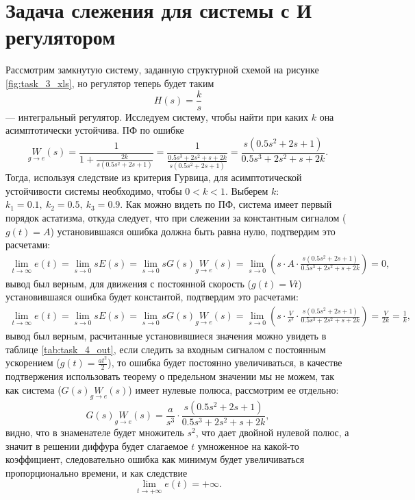 \section{Задача слежения для системы с И регулятором}

Рассмотрим замкнутую систему, заданную структурной схемой на рисунке \ref{fig:task_3_xls},
но регулятор теперь будет таким
\begin{equation*}
    H(s)=\frac{k}{s}
\end{equation*}
--- интегральный регулятор. Исследуем систему, чтобы найти при каких $k$ она асимптотически
устойчива. ПФ по ошибке
\begin{equation*}
    \underset{g\rightarrow e}{W}(s)=\frac{1}{1+\frac{2k}{s(0.5s^2+2s+1)}}=\frac{1}{\frac{0.5s^3+2s^2+s+2k}{s(0.5s^2+2s+1)}}=\frac{s(0.5s^2+2s+1)}{0.5s^3+2s^2+s+2k}.
\end{equation*}
Тогда, используя следствие из критерия Гурвица, для асимптотической устойчивости системы
необходимо, чтобы $0<k<1$. Выберем $k$: $k_1=0.1,\ k_2=0.5,\ k_3=0.9$.
Как можно видеть по ПФ, система имеет первый порядок астатизма, откуда следует, что при слежении за
константным сигналом ($g(t)=A$) установившаяся ошибка должна быть равна нулю, подтвердим это расчетами:
\begin{multline*}
    \lim_{t\rightarrow\infty}e(t)
    =\lim_{s\rightarrow0}sE(s)
    =\lim_{s\rightarrow0}sG(s)\underset{g\rightarrow e}{W}(s)
    =\lim_{s\rightarrow0}\left(s\cdot A\cdot\frac{s(0.5s^2+2s+1)}{0.5s^3+2s^2+s+2k}\right)
    =0,
\end{multline*}
вывод был верным, для движения с постоянной 
скорость ($g(t)=Vt$) установившаяся ошибка будет константой, подтвердим это расчетами:
\begin{multline*}
    \lim_{t\rightarrow\infty}e(t)
    =\lim_{s\rightarrow0}sE(s)
    =\lim_{s\rightarrow0}sG(s)\underset{g\rightarrow e}{W}(s)
    =\lim_{s\rightarrow0}\left(s\cdot\frac{V}{s^2}\cdot\frac{s(0.5s^2+2s+1)}{0.5s^3+2s^2+s+2k}\right)
    =\frac{V}{2k}=\frac{1}{k},
\end{multline*}
вывод был верным, расчитанные установившиеся значения можно увидеть в таблице \ref{tab:task_4_out},
если следить за входным сигналом с 
постоянным ускорением ($g(t)=\frac{at^2}{2}$), то ошибка будет постоянно увеличиваться, в качестве подтвержения
использовать теорему о предельном значении мы не можем, так как система ($G(s)\underset{g\rightarrow e}{W}(s)$)
имеет нулевые полюса, рассмотрим ее отдельно:
\begin{equation*}
    G(s)\underset{g\rightarrow e}{W}(s)
    =\frac{a}{s^3}\cdot\frac{s(0.5s^2+2s+1)}{0.5s^3+2s^2+s+2k},
\end{equation*}
видно, что в знаменателе будет множитель $s^2$, что дает двойной нулевой полюс, а
значит в решении диффура будет слагаемое $t$ умноженное на какой-то коэффициент, следовательно ошибка как минимум
будет увеличиваться пропорционально времени, и как следствие
\begin{equation*}
    \lim\limits_{t\to+\infty}e(t)=+\infty.
\end{equation*}

